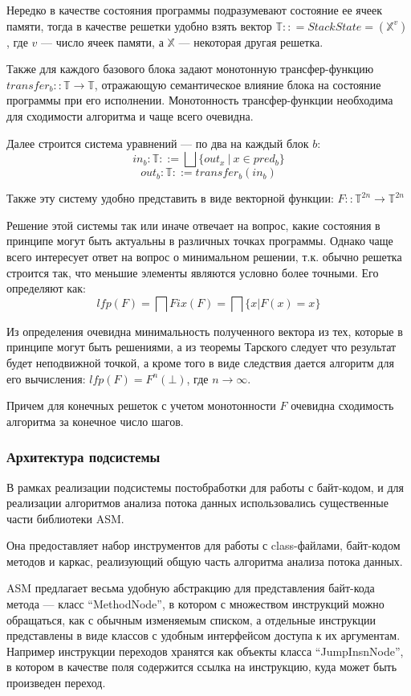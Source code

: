 Нередко в качестве состояния программы подразумевают состояние ее ячеек памяти, тогда в качестве
решетки удобно взять вектор $\mathbb{T} :: = StackState = (\mathbb{X}^v)$, где $v$ --- число ячеек
памяти, а $\mathbb{X}$ --- некоторая другая решетка.

Также для каждого базового блока задают монотонную трансфер-функцию
$transfer_b :: \mathbb{T} \to \mathbb{T}$, отражающую семантическое влияние блока на состояние программы
при его исполнении.
Монотонность трансфер-функции необходима для сходимости алгоритма и чаще всего очевидна.

Далее строится система уравнений --- по два на каждый блок $b$:
$$in_b: \mathbb{T} ::= \bigsqcup \{out_x\ |\ x \in pred_b\}$$
$$out_b: \mathbb{T} ::= transfer_b(in_b)$$

Также эту систему удобно представить в виде векторной функции: $F :: \mathbb{T}^{2n} \to \mathbb{T}^{2n}$

Решение этой системы так или иначе отвечает на вопрос, какие состояния в принципе могут быть
актуальны в различных точках программы.
Однако чаще всего интересует ответ на вопрос о минимальном решении, т.к. обычно решетка строится
так, что меньшие элементы являются условно более точными.
Его определяют как:
$$lfp(F) = \bigsqcap Fix(F) =  \bigsqcap\{ x | F(x)= x\}$$

Из определения очевидна минимальность полученного вектора из тех, которые в принципе могут быть
решениями, а из теоремы Тарского следует что результат будет неподвижной точкой, а кроме
того в виде следствия дается алгоритм для его вычисления: $lfp(F) = F^n(\bot)$, где $n \to \infty$.

Причем для конечных решеток с учетом монотонности $F$ очевидна сходимость алгоритма за конечное
число шагов.

\subsubsection{Архитектура подсистемы}
В рамках реализации подсистемы постобработки для работы с байт-кодом, и для реализации алгоритмов
анализа потока данных использовались существенные части библиотеки ASM.

Она предоставляет набор инструментов для работы с class-файлами, байт-кодом методов и каркас,
реализующий общую часть алгоритма анализа потока данных.

ASM предлагает весьма удобную абстракцию для представления байт-кода метода --- класс
``MethodNode'', в котором с множеством инструкций можно обращаться, как с обычным изменяемым
списком, а отдельные инструкции представлены в виде классов с удобным интерфейсом доступа
к их аргументам. Например инструкции переходов хранятся как объекты класса ``JumpInsnNode'',
в котором в качестве поля содержится ссылка на инструкцию, куда может быть произведен переход.

